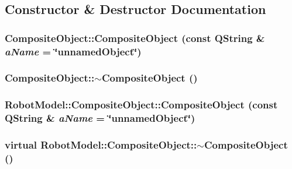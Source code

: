 \subsection{Constructor \& Destructor Documentation}
\hypertarget{class_robot_model_1_1_composite_object_a28feebceeaeec6c4d4ec6adc9fc52d90}{
\subsubsection[{CompositeObject}]{\setlength{\rightskip}{0pt plus 5cm}CompositeObject::CompositeObject (const QString \& {\em aName} = {\ttfamily \char`\"{}unnamedObject\char`\"{}})}}
\label{class_robot_model_1_1_composite_object_a28feebceeaeec6c4d4ec6adc9fc52d90}
\hypertarget{class_robot_model_1_1_composite_object_a52c02078b1e3e9f4f436874fb044a27b}{
\subsubsection[{$\sim$CompositeObject}]{\setlength{\rightskip}{0pt plus 5cm}CompositeObject::$\sim$CompositeObject ()}}
\label{class_robot_model_1_1_composite_object_a52c02078b1e3e9f4f436874fb044a27b}
\hypertarget{class_robot_model_1_1_composite_object_a54944e07b3c0b31d2b7a40e6d1e6e3c2}{
\subsubsection[{CompositeObject}]{\setlength{\rightskip}{0pt plus 5cm}RobotModel::CompositeObject::CompositeObject (const QString \& {\em aName} = {\ttfamily \char`\"{}unnamedObject\char`\"{}})}}
\label{class_robot_model_1_1_composite_object_a54944e07b3c0b31d2b7a40e6d1e6e3c2}
\hypertarget{class_robot_model_1_1_composite_object_ad92ee593ee6e4e417ac3869d4ceec1da}{
\subsubsection[{$\sim$CompositeObject}]{\setlength{\rightskip}{0pt plus 5cm}virtual RobotModel::CompositeObject::$\sim$CompositeObject ()}}
\label{class_robot_model_1_1_composite_object_ad92ee593ee6e4e417ac3869d4ceec1da}



